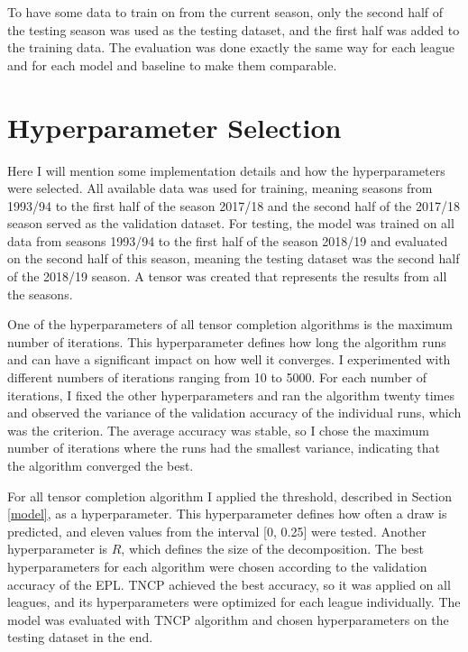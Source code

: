 \documentclass[thesis=M,english]{FITthesis}[2019/12/23]
\begin{document}
To have some data to train on from the current season, only the second half of the testing season was used as the testing dataset, and the first half was added to the training data. The evaluation was done exactly the same way for each league and for each model and baseline to make them comparable.

\section{Hyperparameter Selection}
\label{hyperparameters}
Here I will mention some implementation details and how the hyperparameters were selected. All available data was used for training, meaning seasons from 1993/94 to the first half of the season 2017/18 and the second half of the 2017/18 season served as the validation dataset. For testing, the model was trained on all data from seasons 1993/94 to the first half of the season 2018/19 and evaluated on the second half of this season, meaning the testing dataset was the second half of the 2018/19 season. A tensor was created that represents the results from all the seasons.

One of the hyperparameters of all tensor completion algorithms is the maximum number of iterations. This hyperparameter defines how long the algorithm runs and can have a significant impact on how well it converges. I experimented with different numbers of iterations ranging from 10 to 5000. For each number of iterations, I fixed the other hyperparameters and ran the algorithm twenty times and observed the variance of the validation accuracy of the individual runs, which was the criterion. The average accuracy was stable, so I chose the maximum number of iterations where the runs had the smallest variance, indicating that the algorithm converged the best.

For all tensor completion algorithm I applied the threshold, described in Section \ref{model}, as a hyperparameter. This hyperparameter defines how often a draw is predicted, and eleven values from the interval [0, 0.25] were tested. Another hyperparameter is $R$, which defines the size of the decomposition. The best hyperparameters for each algorithm were chosen according to the validation accuracy of the EPL. TNCP achieved the best accuracy, so it was applied on all leagues, and its hyperparameters were optimized for each league individually. The model was evaluated with TNCP algorithm and chosen hyperparameters on the testing dataset in the end.
\end{document}
